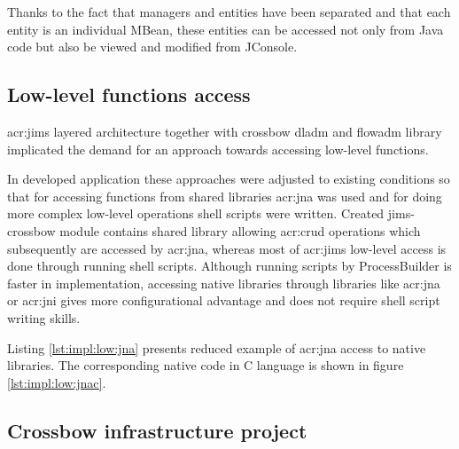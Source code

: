 \documentclass[11pt,openany]{book}
\begin{document}
        Thanks to the fact that managers and entities have been separated and that each entity is an individual MBean,
        these entities can be accessed not only from Java code but also be viewed and modified from JConsole.


      \subsection{Low-level functions access}
      \label{sec:impl:low}

        \gls{acr:jims} layered architecture together with crossbow dladm and flowadm library implicated the demand for 
        an approach towards accessing low-level functions.

        In developed application these approaches were adjusted to existing conditions so that for accessing functions
        from shared libraries \gls{acr:jna} was used and for doing more complex low-level operations shell scripts were
        written. Created jims-crossbow module contains shared library allowing \gls{acr:crud} operations which
        subsequently are accessed by \gls{acr:jna}, whereas most of \gls{acr:jims} low-level access is done through
        running shell scripts. Although running scripts by ProcessBuilder is faster in implementation, accessing native
        libraries through libraries like \gls{acr:jna} or \gls{acr:jni} gives more configurational advantage and does
        not require shell script writing skills.

        Listing \ref{lst:impl:low:jna} presents reduced example of \gls{acr:jna} access to native libraries. The
        corresponding native code in C language is shown in figure \ref{lst:impl:low:jnac}. \\


        \noindent
          \begin{minipage}{\textwidth}
          
        \end{minipage}  

        \noindent
        \begin{minipage}{\textwidth}
          
        \end{minipage}


      \subsection{Crossbow infrastructure project}
      \label{sec:impl:infrastructure}
\end{document}
